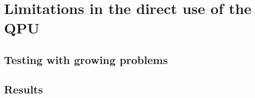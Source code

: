 \chapter{Limitations in the direct use of the QPU}
\section{Testing with growing problems}
\section{Results}